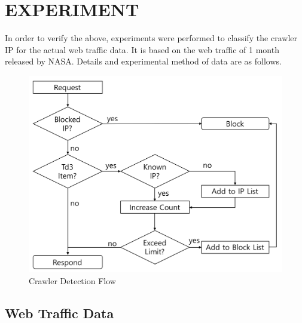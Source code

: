 \documentclass[sigconf,anonymous=false]{acmart}
\begin{document}
%
%
\section{EXPERIMENT}
In order to verify the above, experiments were performed to classify the crawler IP for the actual web traffic data. It is based on the web traffic of 1 month released by NASA. Details and experimental method of data are as follows.

\begin{figure} [H]
    \includegraphics[width=0.88\columnwidth]{figs/flow_chart_01.png}
    \caption{Crawler Detection Flow}
    \label{fig:my_label}
\end{figure}


\subsection{Web Traffic Data}
\end{document}
